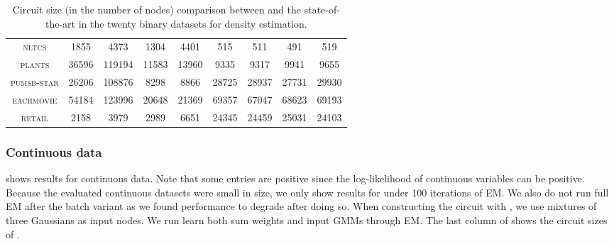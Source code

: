 \begin{table}[t]
{\begin{tabular}{c|cccc|cccc}
    \textsc{nltcs     } & 1855    & 4373    & 1304  & 4401    & 515       & 511     & 491     & 519     \\
    \textsc{plants    } & 36596   & 119194  & 11583 & 13960   & 9335      & 9317    & 9941    & 9655    \\
    \textsc{pumsb-star} & 26206   & 108876  & 8298  & 8866    & 28725     & 28937   & 27731   & 29930   \\
    \textsc{eachmovie } & 54184   & 123996  & 20648 & 21369   & 69357     & 67047   & 68623   & 69193   \\
    \textsc{retail    } & 2158    & 3979    & 2989  & 6651    & 24345     & 24459   & 25031   & 24103   \\
    \hline
  \end{tabular}
  }
  \caption{Circuit size (in the number of nodes) comparison between  and the
    state-of-the-art in the twenty binary datasets for density estimation.}
  \label{tab:binsize}
\end{table}

\subsubsection{Continuous data}

 shows results for continuous data. Note that some entries are positive since the
log-likelihood of continuous variables can be positive. Because the evaluated continuous datasets
were small in size, we only show results for  under 100 iterations of EM. We also
do not run full EM after the batch variant as we found performance to degrade after doing so. When
constructing the circuit with , we use mixtures of three Gaussians as input
nodes. We run learn both sum weights and input GMMs through EM. The last column of 
shows the circuit sizes of .

